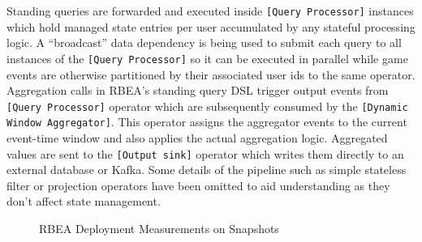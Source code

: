 Standing queries are forwarded and executed inside \texttt{[Query Processor]} instances which hold managed state entries per user accumulated by any stateful processing logic. A ``broadcast'' data dependency is being used to submit each query to all instances of the \texttt{[Query Processor]} so it can be executed in parallel while game events are otherwise partitioned by their associated user ids to the same operator. Aggregation calls in RBEA's standing query DSL trigger output events from \texttt{[Query Processor]} operator which are subsequently consumed by the \texttt{[Dynamic Window Aggregator]}. This operator assigns the aggregator events to the current event-time window and also applies the actual aggregation logic. Aggregated values are sent to the \texttt{[Output sink]} operator which writes them directly to an external database or Kafka. Some details of the pipeline such as simple stateless filter or projection operators have been omitted to aid understanding as they don't affect state management.


\begin{figure}[htp]
\centering
{}\medskip
{}\medskip
{}
\vspace*{-0.25in}
\caption{RBEA Deployment Measurements on Snapshots }
\label{fig:kingmetrics}
\end{figure}

